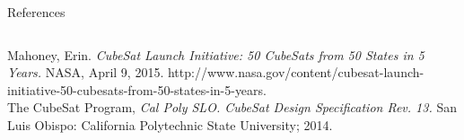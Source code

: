 \documentclass[slidestop,compress]{beamer}
\begin{document}
\begin{frame}[plain]
\begin{block}{\vspace{0.5 cm}

\centering References}
\begin{columns}
\begin{thebibliography}{9}
Mahoney, Erin. {\it CubeSat Launch Initiative: 50 CubeSats from 50 States in 5 Years.} NASA, April 9, 2015. http://www.nasa.gov/content/cubesat-launch-initiative-50-cubesats-from-50-states-in-5-years.\\

The CubeSat Program, {\it Cal Poly SLO. CubeSat Design Specification Rev. 13.} San Luis
Obispo: California Polytechnic State University; 2014.
\end{thebibliography}
\end{columns}

\vspace{0.5 cm}
\end{block}    
\end{frame}
\end{document}
